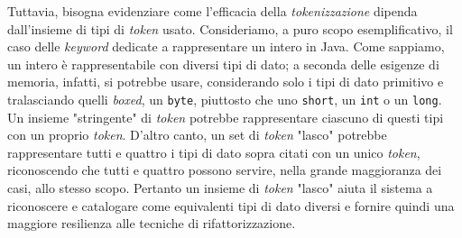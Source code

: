 Tuttavia, bisogna evidenziare come l'efficacia della \textit{tokenizzazione} dipenda dall'insieme di tipi di \textit{token} usato.
%
Consideriamo, a puro scopo esemplificativo, il caso delle \textit{keyword} dedicate a rappresentare un intero in Java.
%
Come sappiamo, un intero è rappresentabile con diversi tipi di dato; a seconda delle esigenze di memoria, infatti, si potrebbe usare, considerando solo i tipi di dato primitivo e tralasciando quelli \textit{boxed}, un \texttt{byte}, piuttosto che uno \texttt{short}, un \texttt{int} o un \texttt{long}. 
%
Un insieme "stringente" di \textit{token} potrebbe rappresentare ciascuno di questi tipi con un proprio \textit{token}.
%
D'altro canto, un set di \textit{token} "lasco" potrebbe rappresentare tutti e quattro i tipi di dato sopra citati con un unico \textit{token}, riconoscendo che tutti e quattro possono servire, nella grande maggioranza dei casi, allo stesso scopo.
%
Pertanto un insieme di \textit{token} "lasco" aiuta il sistema a riconoscere e catalogare come equivalenti tipi di dato diversi e fornire quindi una maggiore resilienza alle tecniche di rifattorizzazione.

